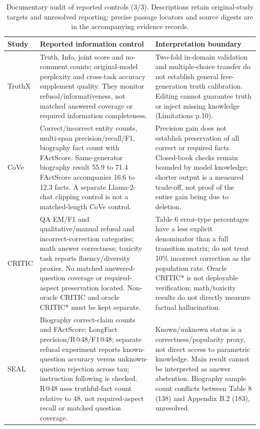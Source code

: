 \begin{table}[tp]
\centering\small\setlength{\tabcolsep}{5pt}\renewcommand{\arraystretch}{1.12}
\begin{tabularx}{\textwidth}{@{}>{\raggedright\arraybackslash}p{}>{\raggedright\arraybackslash}p{}>{\raggedright\arraybackslash}X@{}}\toprule
Study & Reported information control & Interpretation boundary \\ \midrule
TruthX \citep{zhang-etal-2024-truthx} & Truth, Info, joint score and no-comment counts; original-model perplexity and cross-task accuracy supplement quality. They monitor refusal/informativeness, not matched answered coverage or required information completeness. & Two-fold in-domain validation and multiple-choice transfer do not establish general free-generation truth calibration. Editing cannot guarantee truth or inject missing knowledge (Limitations p.10). \\
CoVe \citep{dhuliawala-etal-2024-chain} & Correct/incorrect entity counts, multi-span precision/recall/F1, biography fact count with FActScore. Same-generator biography result 55.9 to 71.4 FActScore accompanies 16.6 to 12.3 facts. A separate Llama-2-chat clipping control is not a matched-length CoVe control. & Precision gain does not establish preservation of all correct or required facts. Closed-book checks remain bounded by model knowledge; shorter output is a measured trade-off, not proof of the entire gain being due to deletion. \\
CRITIC \citep{extcritic2024} & QA EM/F1 and qualitative/manual refusal and incorrect-correction categories; math answer correctness; toxicity task reports fluency/diversity proxies. No matched answered-question coverage or required-aspect preservation located. Non-oracle CRITIC and oracle CRITIC* must be kept separate. & Table 6 error-type percentages have a less explicit denominator than a full transition matrix; do not treat 10\% incorrect correction as the population rate. Oracle CRITIC* is not deployable verification; math/toxicity results do not directly measure factual hallucination. \\
SEAL \citep{huang-etal-2025-alleviating} & Biography correct-claim counts and FActScore; LongFact precision/R@48/F1@48; separate refusal experiment reports known-question accuracy versus unknown-question rejection across tau; instruction following is checked. R@48 uses truthful-fact count relative to 48, not required-aspect recall or matched question coverage. & Known/unknown status is a correctness/popularity proxy, not direct access to parametric knowledge. Main result cannot be interpreted as answer abstention. Biography sample count conflicts between Table 8 (138) and Appendix B.2 (183), unresolved. \\
\bottomrule\end{tabularx}
\caption{Documentary audit of reported controls (3/3). Descriptions retain original-study targets and unresolved reporting; precise passage locators and source digests are in the accompanying evidence records.}
\label{tab:audit-3}\end{table}

